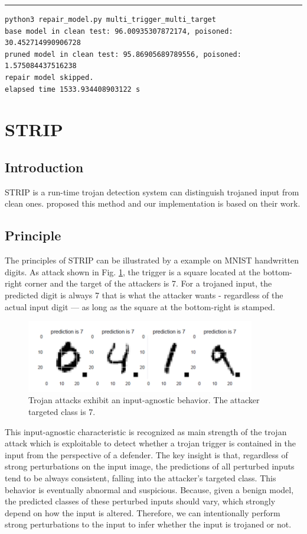 \documentclass[letterpaper]{article}
\begin{document}
\noindent\rule{2cm}{0.4pt}
\begin{lstlisting}
python3 repair_model.py multi_trigger_multi_target
base model in clean test: 96.00935307872174, poisoned: 30.452714990906728
pruned model in clean test: 95.86905689789556, poisoned: 1.575084437516238
repair model skipped.
elapsed time 1533.934408903122 s
\end{lstlisting}

\section*{STRIP}
\subsection*{Introduction}
STRIP is a run-time trojan detection system can distinguish trojaned input from clean ones. \cite{gao2019strip} proposed this method and our implementation is based on their work.

\subsection*{Principle}
The principles of STRIP can be illustrated by a example on MNIST handwritten digits. As attack shown in Fig. \ref{fig:strip_1}, the trigger is a square located at the bottom-right corner and the target of the attackers is 7.
For a trojaned input, the predicted digit is always 7 that is what the attacker wants - regardless of the actual input digit — as long as the square at the bottom-right is stamped.

\begin{figure}[H]
    \centering
    \includegraphics[width=10cm]{img/strip_1.png}
    \caption{Trojan attacks exhibit an input-agnostic behavior. The attacker targeted class is 7.}
    \label{fig:strip_1}
\end{figure}

This input-agnostic characteristic is recognized as main strength of the trojan attack which is exploitable to detect whether a trojan trigger is contained in the input from the perspective of a defender. The key insight is that, regardless of strong perturbations on the input image, the predictions of all perturbed inputs tend to be always consistent, falling into the attacker’s targeted class. This behavior is eventually abnormal and suspicious. Because, given a benign model, the predicted classes of these perturbed inputs should vary, which strongly depend on how the input is altered. Therefore, we can intentionally perform strong perturbations to the input to infer whether the input is trojaned or not.
\end{document}
